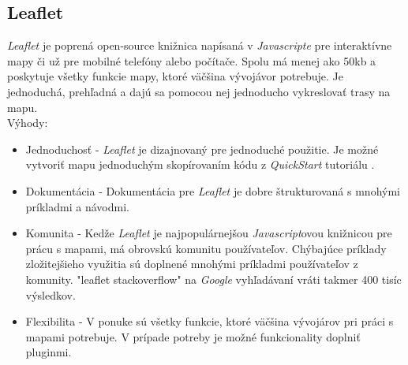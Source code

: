 \subsection{Leaflet \label{section:leaflet}}
\indent \indent \textit{Leaflet} je poprená open-source knižnica napísaná v \textit{Javascripte} pre interaktívne mapy či už pre mobilné telefóny alebo počítače. Spolu má menej ako 50\acrshort{kb} a poskytuje všetky funkcie mapy, ktoré väčšina vývojávor potrebuje\cite{leaflet}. Je jednoduchá, prehľadná a dajú sa pomocou nej jednoducho vykreslovať trasy na mapu.\\
Výhody\cite{leaflet-pros}: 
\begin{itemize}
    \item Jednoduchosť - \textit{Leaflet} je dizajnovaný pre jednoduché použitie. Je možné vytvoriť mapu jednoduchým skopírovaním kódu z \textit{QuickStart} tutoriálu \cite{leaflet-quickstart}.
    \item Dokumentácia - Dokumentácia pre \textit{Leaflet} je dobre štrukturovaná s mnohými príkladmi a návodmi.
    \item Komunita - Kedže \textit{Leaflet} je najpopulárnejšou \textit{Javascript}ovou knižnicou pre prácu s mapami, má obrovskú komunitu používateľov. Chýbajúce príklady zložitejšieho využitia sú doplnené mnohými príkladmi používateľov z komunity. "leaflet stackoverflow" na \textit{Google} vyhľadávaní vráti takmer 400 tisíc výsledkov. 
    \item Flexibilita - V ponuke sú všetky funkcie, ktoré väčšina vývojárov pri práci s mapami potrebuje. V prípade potreby je možné funkcionality doplniť pluginmi.
\end{itemize} 